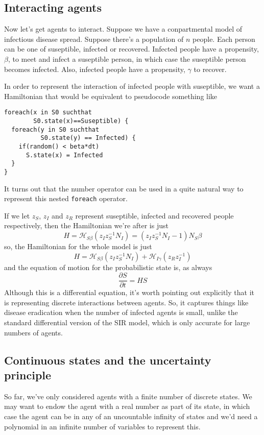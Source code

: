 \documentclass[letterpaper,twocolumn,10pt]{article}
\begin{document}
\subsection{Interacting agents}

Now let's get agents to interact. Suppose we have a conpartmental model of infectious disease spread. Suppose there's a population of $n$ people. Each person can be one of suseptible, infected or recovered. Infected people have a propensity, $\beta$, to meet and infect a suseptible person, in which case the suseptible person becomes infected. Also, infected people have a propensity, $\gamma$ to recover.

In order to represent the interaction of infected people with suseptible, we want a Hamiltonian that would be equivalent to pseudocode something like
\begin{verbatim}
foreach(x in S0 suchthat 
        S0.state(x)==Suseptible) {
  foreach(y in S0 suchthat
          S0.state(y) == Infected) {
    if(random() < beta*dt)
      S.state(x) = Infected
  }
}
\end{verbatim}

It turns out that the number operator can be used in a quite natural way to represent this nested \texttt{foreach} operator.

If we let $z_S$, $z_I$ and $z_R$ represent suseptible, infected and recovered people respectively, then the Hamiltonian we're after is just
\[
H = \mathcal{H}_{S\beta}(z_Iz_S^{-1}N_I) = (z_Iz_S^{-1}N_I - 1)N_S\beta
\]
so, the Hamiltonian for the whole model is just
\[
H = \mathcal{H}_{S\beta}(z_Iz_S^{-1}N_I) + \mathcal{H}_{I\gamma}(z_Rz_I^{-1})
\]
and the equation of motion for the probabilistic state is, as always
\[
\frac{\partial S}{\partial t} = HS
\]
Although this is a differential equation, it's worth pointing out explicitly that it is representing discrete interactions between agents. So, it captures things like disease eradication when the number of infected agents is small, unlike the standard differential version of the SIR model, which is only accurate for large numbers of agents.

\subsection{Continuous states and the uncertainty principle}

So far, we've only considered agents with a finite number of discrete states. We may want to endow the agent with a real number as part of its state, in which case the agent can be in any of an uncountable infinity of states and we'd need a polynomial in an infinite number of variables to represent this.
\end{document}
